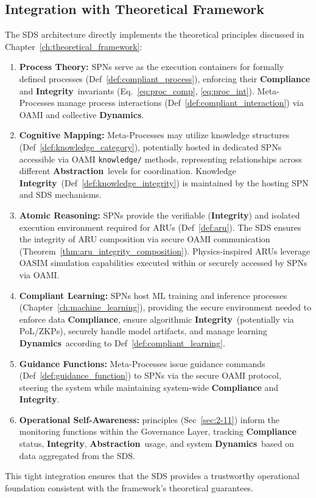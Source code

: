 \documentclass[12pt,a4paper]{report}
\newcommand{\Integrity}{\textbf{Integrity}}
\newcommand{\Abstraction}{\textbf{Abstraction}}
\newcommand{\Dynamics}{\textbf{Dynamics}}
\begin{document}
	\subsection{Integration with Theoretical Framework} %
	\label{sec:4-2-2} %
	
	The SDS architecture directly implements the theoretical principles discussed in Chapter~\ref{ch:theoretical_framework}:
	\begin{enumerate}[noitemsep]
		\item \textbf{Process Theory:} SPNs serve as the execution containers for formally defined processes (Def~\ref{def:compliant_process}), enforcing their \textbf{Compliance} and \Integrity\ invariants (Eq.~\ref{eq:proc_comp}, \ref{eq:proc_int}). Meta-Processes manage process interactions (Def~\ref{def:compliant_interaction}) via OAMI and collective \Dynamics.
		\item \textbf{Cognitive Mapping:} Meta-Processes may utilize knowledge structures (Def~\ref{def:knowledge_category}), potentially hosted in dedicated SPNs accessible via OAMI \texttt{knowledge/} methods, representing relationships across different \Abstraction\ levels for coordination. Knowledge \Integrity\ (Def~\ref{def:knowledge_integrity}) is maintained by the hosting SPN and SDS mechanisms.
		\item \textbf{Atomic Reasoning:} SPNs provide the verifiable (\Integrity) and isolated execution environment required for ARUs (Def~\ref{def:aru}). The SDS ensures the integrity of ARU composition via secure OAMI communication (Theorem~\ref{thm:aru_integrity_composition}). Physics-inspired ARUs leverage OASIM simulation capabilities executed within or securely accessed by SPNs via OAMI.
		\item \textbf{Compliant Learning:} SPNs host ML training and inference processes (Chapter~\ref{ch:machine_learning}), providing the secure environment needed to enforce data \textbf{Compliance}, ensure algorithmic \Integrity\ (potentially via PoL/ZKPs), securely handle model artifacts, and manage learning \Dynamics\ according to Def~\ref{def:compliant_learning}.
		\item \textbf{Guidance Functions:} Meta-Processes issue guidance commands (Def~\ref{def:guidance_function}) to SPNs via the secure OAMI protocol, steering the system while maintaining system-wide \textbf{Compliance} and \Integrity.
		\item \textbf{Operational Self-Awareness:} principles (Sec~\ref{sec:2-11}) inform the monitoring functions within the Governance Layer, tracking \textbf{Compliance} status, \Integrity, \Abstraction\ usage, and system \Dynamics\ based on data aggregated from the SDS.
	\end{enumerate}
	This tight integration ensures that the SDS provides a trustworthy operational foundation consistent with the framework's theoretical guarantees.
	
\end{document}
